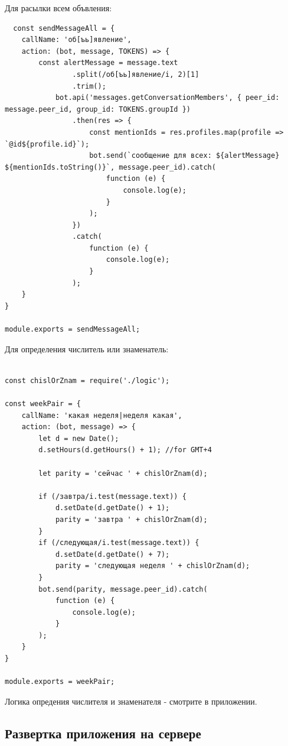 \documentclass[bachelor, och, coursework, times]{SCWorks}
\begin{document}
Для расылки всем объвления:
\begin{lstlisting}
  const sendMessageAll = {
    callName: 'об[ъь]явление',
    action: (bot, message, TOKENS) => {
        const alertMessage = message.text
                .split(/об[ъь]явление/i, 2)[1]
                .trim();
            bot.api('messages.getConversationMembers', { peer_id: message.peer_id, group_id: TOKENS.groupId })
                .then(res => {
                    const mentionIds = res.profiles.map(profile => `@id${profile.id}`);
                    bot.send(`сообщение для всех: ${alertMessage} ${mentionIds.toString()}`, message.peer_id).catch(
                        function (e) {
                            console.log(e);
                        }
                    );
                })
                .catch(
                    function (e) {
                        console.log(e);
                    }
                );
    }
}

module.exports = sendMessageAll;
\end{lstlisting}

Для определения числитель или знаменатель:
\begin{lstlisting}
      
const chislOrZnam = require('./logic');

const weekPair = {
    callName: 'какая неделя|неделя какая',
    action: (bot, message) => {
        let d = new Date();
        d.setHours(d.getHours() + 1); //for GMT+4
        
        let parity = 'сейчас ' + chislOrZnam(d);
        
        if (/завтра/i.test(message.text)) {
            d.setDate(d.getDate() + 1);
            parity = 'завтра ' + chislOrZnam(d);
        }
        if (/следующая/i.test(message.text)) {
            d.setDate(d.getDate() + 7);
            parity = 'следующая неделя ' + chislOrZnam(d);
        }
        bot.send(parity, message.peer_id).catch(
            function (e) {
                console.log(e);
            }
        );
    }
}

module.exports = weekPair;
\end{lstlisting}

Логика опредения числителя и знаменателя - смотрите в приложении.


\subsection {Развертка приложения на сервере}
\end{document}
